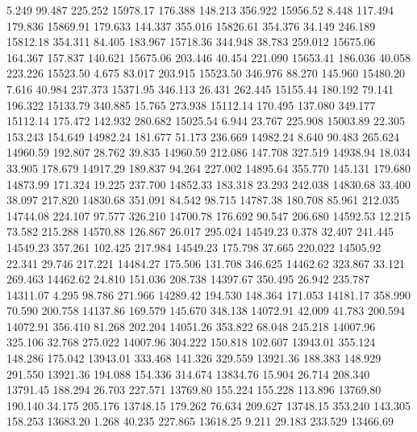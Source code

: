    5.249   99.487  225.252     15978.17
 176.388  148.213  356.922     15956.52
   8.448  117.494  179.836     15869.91
 179.633  144.337  355.016     15826.61
 354.376   34.149  246.189     15812.18
 354.311   84.405  183.967     15718.36
 344.948   38.783  259.012     15675.06
 164.367  157.837  140.621     15675.06
 203.446   40.454  221.090     15653.41
 186.036   40.058  223.226     15523.50
   4.675   83.017  203.915     15523.50
 346.976   88.270  145.960     15480.20
   7.616   40.984  237.373     15371.95
 346.113   26.431  262.445     15155.44
 180.192   79.141  196.322     15133.79
 340.885   15.765  273.938     15112.14
 170.495  137.080  349.177     15112.14
 175.472  142.932  280.682     15025.54
   6.944   23.767  225.908     15003.89
  22.305  153.243  154.649     14982.24
 181.677   51.173  236.669     14982.24
   8.640   90.483  265.624     14960.59
 192.807   28.762   39.835     14960.59
 212.086  147.708  327.519     14938.94
  18.034   33.905  178.679     14917.29
 189.837   94.264  227.002     14895.64
 355.770  145.131  179.680     14873.99
 171.324   19.225  237.700     14852.33
 183.318   23.293  242.038     14830.68
  33.400   38.097  217.820     14830.68
 351.091   84.542   98.715     14787.38
 180.708   85.961  212.035     14744.08
 224.107   97.577  326.210     14700.78
 176.692   90.547  206.680     14592.53
  12.215   73.582  215.288     14570.88
 126.867   26.017  295.024     14549.23
   0.378   32.407  241.445     14549.23
 357.261  102.425  217.984     14549.23
 175.798   37.665  220.022     14505.92
  22.341   29.746  217.221     14484.27
 175.506  131.708  346.625     14462.62
 323.867   33.121  269.463     14462.62
  24.810  151.036  208.738     14397.67
 350.495   26.942  235.787     14311.07
   4.295   98.786  271.966     14289.42
 194.530  148.364  171.053     14181.17
 358.990   70.590  200.758     14137.86
 169.579  145.670  348.138     14072.91
  42.009   41.783  200.594     14072.91
 356.410   81.268  202.204     14051.26
 353.822   68.048  245.218     14007.96
 325.106   32.768  275.022     14007.96
 304.222  150.818  102.607     13943.01
 355.124  148.286  175.042     13943.01
 333.468  141.326  329.559     13921.36
 188.383  148.929  291.550     13921.36
 194.088  154.336  314.674     13834.76
  15.904   26.714  208.340     13791.45
 188.294   26.703  227.571     13769.80
 155.224  155.228  113.896     13769.80
 190.140   34.175  205.176     13748.15
 179.262   76.634  209.627     13748.15
 353.240  143.305  158.253     13683.20
   1.268   40.235  227.865     13618.25
   9.211   29.183  233.529     13466.69
